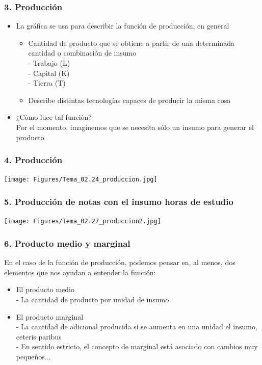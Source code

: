 \documentclass[14pt]{beamer}
\begin{document}
\begin{frame}
\frametitle{3. Producción}
\begin{itemize}
    \item La gráfica se usa para describir la función de producción, en general
        \begin{itemize}
        \item Cantidad de producto que se obtiene a partir de una determinada cantidad o combinación de insumo \\
        - Trabajo (L) \\
        - Capital (K) \\
        - Tierra (T)
        \item Describe distintas tecnologías capaces de producir la misma cosa
        \end{itemize}
    \item ¿Cómo luce tal función? \\
    Por el momento, imaginemos que se necesita sólo un insumo para generar el producto
\end{itemize} 
\end{frame}

\begin{frame}
\frametitle{4. Producción}
\centering
\texttt{[image: Figures/Tema\_02.24\_produccion.jpg]}
\end{frame}


\begin{frame}
\frametitle{5. Producción de notas con el insumo horas de estudio}
\centering
\texttt{[image: Figures/Tema\_02.27\_produccion2.jpg]}
\end{frame}


\begin{frame}
\frametitle{6. Producto medio y marginal}
En el caso de la función de producción, podemos pensar en, al menos, dos elementos que nos ayudan a entender la función:
    \begin{itemize}
        \item El producto medio \\
                - La cantidad de producto por unidad de insumo
        \item El producto marginal \\
                - La cantidad de adicional producida si se aumenta en una unidad el insumo, ceteris paribus \\
                - En sentido estricto, el concepto de marginal está asociado con cambios muy pequeños...
    \end{itemize}
\end{frame}
\end{document}

